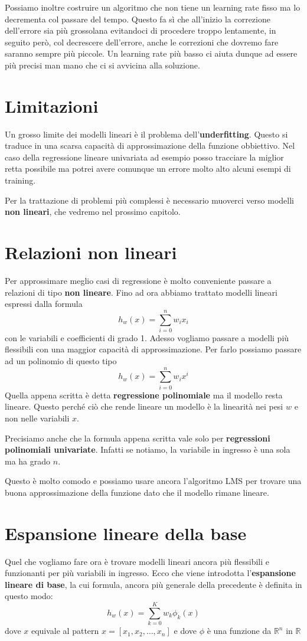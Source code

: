 Possiamo inoltre costruire un algoritmo che non tiene un learning rate fisso ma lo decrementa col passare del tempo.
Questo fa s\`i che all'inizio la correzione dell'errore sia pi\`u grossolana evitandoci di procedere troppo lentamente,
in seguito per\`o, col decrescere dell'errore, anche le correzioni che dovremo fare saranno sempre pi\`u piccole. Un
learning rate pi\`u basso ci aiuta dunque ad essere pi\`u precisi man mano che ci si avvicina alla soluzione.

\section{Limitazioni}
Un grosso limite dei modelli lineari \`e il problema dell'\textbf{underfitting}. Questo si traduce in una scarsa
capacit\`a di approssimazione della funzione obbiettivo. Nel caso della regressione lineare univariata ad esempio posso
tracciare la miglior retta possibile ma potrei avere comunque un errore molto alto alcuni esempi di training.

Per la trattazione di problemi pi\`u complessi \`e necessario muoverci verso modelli \textbf{non lineari}, che vedremo nel
prossimo capitolo.

\section{Relazioni non lineari}
Per approssimare meglio casi di regressione \`e molto conveniente passare a relazioni di tipo \textbf{non lineare}.
Fino ad ora abbiamo trattato modelli lineari espressi dalla formula
\[ h_w(x) = \sum_{i = 0}^n w_i x_i \]
con le variabili e coefficienti di grado 1. Adesso vogliamo passare a modelli pi\`u flessibili con una maggior
capacit\`a di approssimazione. Per farlo possiamo passare ad un polinomio di questo tipo
\[ h_w(x) = \sum_{i = 0}^n w_i x^i \]
Quella appena scritta \`e detta \textbf{regressione polinomiale} ma il modello resta lineare. Questo perch\'e ci\`o che
rende lineare un modello \`e la linearit\`a nei pesi $w$ e non nelle variabili $x$.

Precisiamo anche che la formula appena scritta vale solo per \textbf{regressioni polinomiali univariate}. Infatti se
notiamo, la variabile in ingresso \`e una sola ma ha grado $n$.

Questo \`e molto comodo e possiamo usare ancora l'algoritmo LMS per trovare una buona approssimazione della funzione
dato che il modello rimane lineare.

\section{Espansione lineare della base}
Quel che vogliamo fare ora \`e trovare modelli lineari ancora pi\`u flessibili e funzionanti per pi\`u variabili in
ingresso. Ecco che viene introdotta l'\textbf{espansione lineare di base}, la cui formula, ancora pi\`u generale della
precedente  \`e definita in questo modo:
\[ h_w(x) = \sum_{k = 0}^K w_k \phi_k(x) \]
dove $x$ equivale al pattern $x = [x_1, x_2, \dots, x_n]$ e dove $\phi$ \`e una funzione da
$\mathbb{R}^n$ in $\mathbb{R}$

